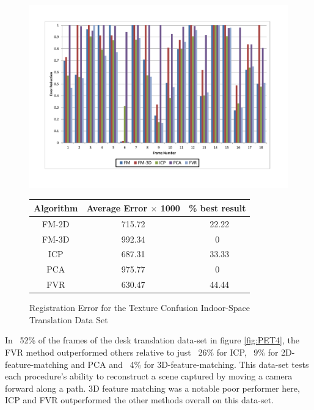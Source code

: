 \begin{figure}
\centering
\includegraphics[width=6in]{images/results/IndoorSpace_texture_confusion_translation}
\caption{Registration Error for the Texture Confusion Indoor-Space Translation Data Set}
\label{fig:PET5}

\begin{tabular}{ccc}
\hline
\textbf{Algorithm} & \textbf{Average Error $\times$ 1000} & \textbf{\% best result}\\ \hline
FM-2D	& 715.72 & ~22.22\\
FM-3D	& 992.34 & 0\\
ICP		& 687.31 & ~33.33\\
PCA		& 975.77 & 0\\
FVR		& 630.47 & ~44.44\\
\end{tabular}
\label{tab:PET5ST}
\end{figure} 


In ~52\% of the frames of the desk translation data-set in figure \ref{fig:PET4}, the FVR method outperformed others relative to just ~26\% for ICP, ~9\% for 2D-feature-matching and PCA and ~4\% for 3D-feature-matching. This data-set tests each procedure's ability to reconstruct a scene captured by moving a camera forward along a path. 3D feature matching was a notable poor performer here, ICP and FVR outperformed the other methods overall on this data-set. \\

